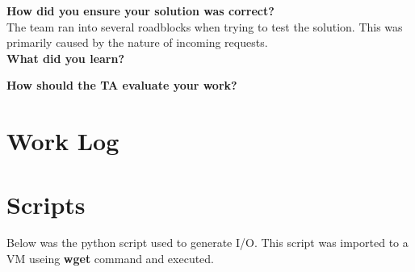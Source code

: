 \documentclass[10pt,onecolumn,draftclsnofoot]{IEEEtran} %
\begin{document}
\begin{singlespace}
	\textbf{How did you ensure your solution was correct?}\\
	
		\normalfont \indent The team ran into several roadblocks when trying to test the solution. This was primarily caused by the nature of incoming requests. \\

	\textbf{What did you learn?}\\
	\normalfont \indent

	\textbf{How should the TA evaluate your work?}\\
	\normalfont \indent	



\newpage
\section{\bf Work Log}

                

\newpage


\section{\bf Scripts}
\normalfont \indent Below was the python script used to generate I/O. This script was imported to a VM useing \textbf{wget} command and executed.  




\end{singlespace}
\restoregeometry
\end{document}
